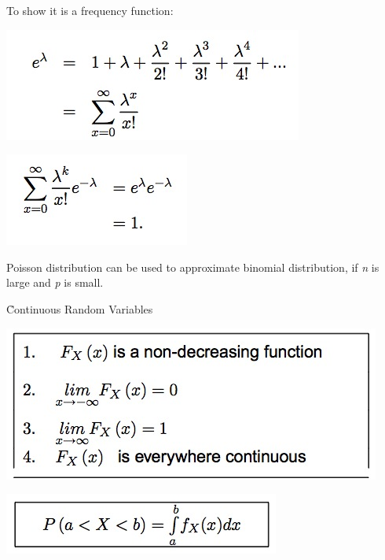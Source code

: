 \documentclass{examnotes}
\begin{document}
{
\vspace{6pt}



To show it is a frequency function: 

\includegraphics[scale=0.7]{./img/2poi1.jpg}

\includegraphics[scale=0.7]{./img/2poi2.jpg}

Poisson distribution can be used to approximate binomial distribution, if \emph{n} is large and \emph{p} is small.

\h{Continuous Random Variables}

\includegraphics[scale=0.7]{./img/2con1.jpg}

\includegraphics[scale=0.7]{./img/2con2.jpg}

}
\end{document}
